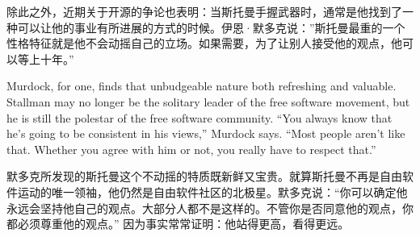 \ifdefined\chs
除此之外，近期关于开源的争论也表明：当斯托曼手握武器时，通常是他找到了一种可以让他的事业有所进展的方式的时候。伊恩·默多克说：''斯托曼最重的一个性格特征就是他不会动摇自己的立场。如果需要，为了让别人接受他的观点，他可以等上十年。''
\fi

\ifdefined\eng
Murdock, for one, finds that unbudgeable nature both refreshing and valuable. Stallman may no longer be the solitary leader of the free software movement, but he is still the polestar of the free software community. ``You always know that he's going to be consistent in his views,'' Murdock says. ``Most people aren't like that. Whether you agree with him or not, you really have to respect that.''
\fi

\ifdefined\chs
默多克所发现的斯托曼这个不动摇的特质既新鲜又宝贵。就算斯托曼不再是自由软件运动的唯一领袖，他仍然是自由软件社区的北极星。默多克说：``你可以确定他永远会坚持他自己的观点。大部分人都不是这样的。不管你是否同意他的观点，你都必须尊重他的观点。'' 因为事实常常证明：他站得更高，看得更远。
\fi

\theendnotes
\setcounter{endnote}{0}
